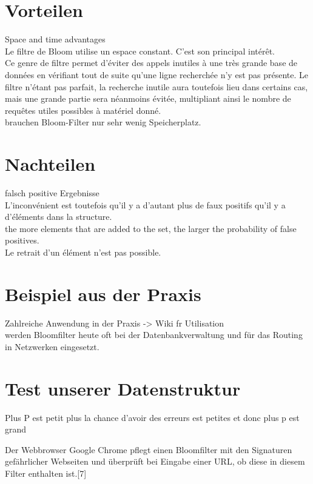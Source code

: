 \documentclass[12pt, letterpaper]{article}
\begin{document}
\section{Vorteilen}

Space and time advantages\\
Le filtre de Bloom utilise un espace constant. C'est son principal intérêt.\\
Ce genre de filtre permet d'éviter des appels inutiles à une très grande base de données en vérifiant tout de suite qu'une ligne recherchée n'y est pas présente. Le filtre n'étant pas parfait, la recherche inutile aura toutefois lieu dans certains cas, mais une grande partie sera néanmoins évitée, multipliant ainsi le nombre de requêtes utiles possibles à matériel donné.\\
brauchen Bloom-Filter nur sehr wenig Speicherplatz.\\

\section{Nachteilen}

falsch positive Ergebnisse\\
L'inconvénient est toutefois qu'il y a d'autant plus de faux positifs qu'il y a d'éléments dans la structure.\\
the more elements that are added to the set, the larger the probability of false positives.\\
Le retrait d'un élément n'est pas possible.\\

\section{Beispiel aus der Praxis}

Zahlreiche Anwendung in der Praxis -> Wiki fr Utilisation\\
werden Bloomfilter heute oft bei der Datenbankverwaltung und für das Routing in Netzwerken eingesetzt.\\

\section{Test unserer Datenstruktur}
Plus P est petit plus la chance d'avoir des erreurs est petites et donc plus p est grand

Der Webbrowser Google Chrome pflegt einen Bloomfilter mit den Signaturen gefährlicher Webseiten und überprüft bei Eingabe einer URL, ob diese in diesem Filter enthalten ist.[7]
\end{document}
